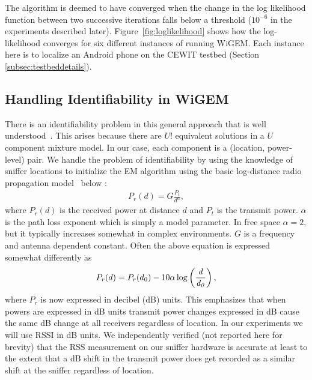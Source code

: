 The algorithm is deemed to have converged when the change in the log likelihood function between two successive iterations falls below a threshold ($10^{-6}$ in the experiments described later). 
Figure~\ref{fig:loglikelihood} shows how the log-likelihood converges for six different instances of running WiGEM. Each instance here is to localize an Android phone on the CEWIT testbed (Section \ref{subsec:testbeddetails}). \\ 


\subsection{Handling Identifiability in WiGEM}
\label{subsec:handlingidentifiabilityinourmodel}

There is an identifiability problem in this general approach that is well understood~\cite{Bishop:2006:PRM:1162264}. This arises because there are $U!$ equivalent solutions
in a $U$ component mixture model. In our case,
each component is a (location,
power-level) pair. 
We handle the problem of identifiability 
by using the knowledge of sniffer locations to initialize the EM algorithm
using the basic log-distance radio propagation model~\cite{Rappaport:2001:WCP:559977, Molkdar91} below :
\begin{align}
P_r(d) = G\frac{P_t}{d^\alpha},
\end{align}
where $P_r(d)$ is the received power at distance $d$ and $P_t$ is the transmit power.
$\alpha$ is the path loss exponent which is simply a model parameter. 
In free space $\alpha =2$, but it typically increases somewhat in complex 
environments. $G$ is a frequency and antenna dependent constant. 
Often the above equation is expressed somewhat differently as 
\begin{align}
P_r(d) = P_r({d_0}) - 10\alpha\log\left(\frac {\it d} {\it d_{0}}\right)
	\label{eqn:pathloss_1},
\end{align}
where $P_r$ is now expressed in decibel (dB) units. This emphasizes that when powers 
are expressed in dB units transmit power changes expressed in dB cause the same dB change at all receivers
regardless of location. In our experiments we will use RSSI in dB units. We independently
verified (not reported here for brevity) that the RSS measurement on our sniffer hardware is accurate at least to the extent
that a dB shift in the transmit power does get recorded as a similar
shift at the sniffer regardless of location.

